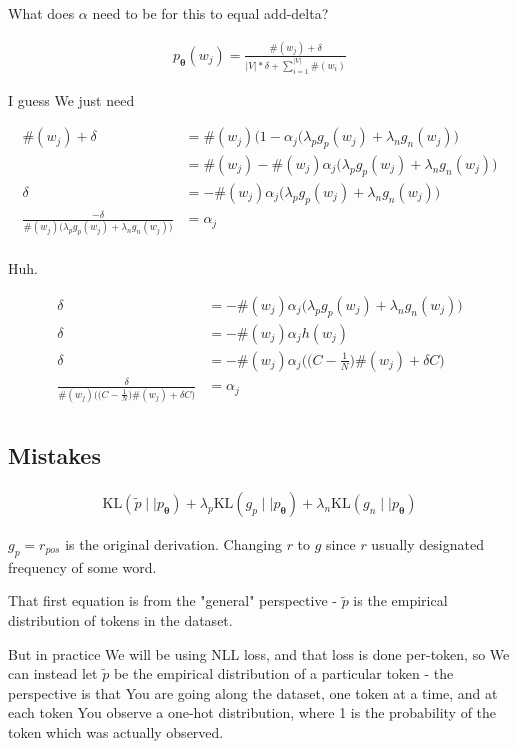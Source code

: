 \documentclass{article}
\newcommand{\KL}{\mathrm{KL}}
\newcommand{\vtheta}{\boldsymbol{\theta}}
\newcommand{\model}{p_{\vtheta}}
\begin{document}
		What does $\alpha$ need to be for this to equal add-delta?
		
		\begin{align}
			\model(w_j) = \frac{\#(w_j) + \delta}{|V|*\delta + \sum^{|V|}_{i=1} \#(w_i)}
		\end{align}
		
		I guess We just need 
		
		\begin{align}
			\#(w_j) + \delta &= \#(w_j)\bigg(1 -\alpha_j\bigg(\lambda_p g_p(w_j) +\lambda_n g_n(w_j)\bigg)\\
			&= \#(w_j) -\#(w_j)\alpha_j\bigg(\lambda_p g_p(w_j) +\lambda_n g_n(w_j)\bigg)\\
			 \delta &= -\#(w_j)\alpha_j\bigg(\lambda_p g_p(w_j) +\lambda_n g_n(w_j)\bigg)\\
			 \frac{-\delta}{\#(w_j)\big(\lambda_p g_p(w_j) +\lambda_n g_n(w_j)\big)} &= \alpha_j\\
		\end{align}
		
		Huh.
		
		\begin{align}
			\delta &=-\#(w_j)\alpha_j\bigg(\lambda_p g_p(w_j) +\lambda_n g_n(w_j)\bigg)\\
			\delta &= -\#(w_j)\alpha_j h(w_j)\\
			\delta &= -\#(w_j)\alpha_j \bigg(\bigg(C - \frac{1}{N}\bigg)\#(w_j) + \delta C\bigg)\\
			\frac{\delta}{\#(w_j)\bigg(\bigg(C - \frac{1}{N}\bigg)\#(w_j) + \delta C\bigg)} &= \alpha_j \\	
		\end{align}
		

\newpage
\subsection{Mistakes}
	
		\begin{align}
			\KL(\tilde{p}\mid\mid\model) + \lambda_p\KL(g_p\mid\mid\model) + \lambda_n\KL(g_n\mid\mid\model)
		\end{align}
		
		$g_p = r_{pos}$ is the original derivation. Changing $r$ to $g$ since $r$ usually designated frequency of some word.
		
		That first equation is from the "general" perspective - $\tilde{p}$ is the empirical distribution of tokens in the dataset.
		
		But in practice We will be using NLL loss, and that loss is done per-token, so We can instead let $\tilde{p}$ be the empirical distribution of a particular token - the perspective is that You are going along the dataset, one token at a time, and at each token You observe a one-hot distribution, where 1 is the probability of the token which was actually observed.
		
\end{document}
